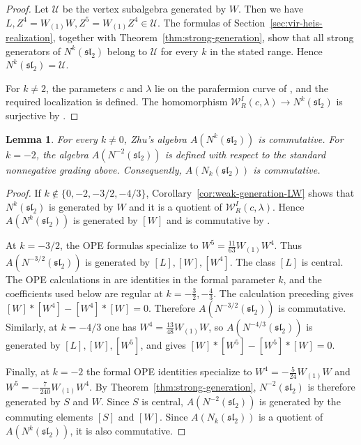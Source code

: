 \documentclass[11 pt]{amsart}
\newtheorem{lemma}{Lemma}
\theoremstyle{definition}
\theoremstyle{plain}
\begin{document}
\begin{proof}
Let $\mathcal U$ be the vertex subalgebra generated by $W$.  Then we have $L,Z^4=W_{(1)}W,Z^5=W_{(1)}Z^4\in\mathcal U$.
The formulas of Section~\ref{sec:vir-heis-realization}, together with
Theorem~\ref{thm:strong-generation}, show that all strong generators of
$N^k(\mathfrak{sl}_2)$ belong to $\mathcal U$ for every $k$ in the stated
range.  Hence $N^k(\mathfrak{sl}_2)=\mathcal U$.

For $k\neq2$, the parameters $c$ and $\lambda$ lie on the parafermion
curve of \cite[Theorem~7.1]{LinshawWinfty}, and the required
localization is defined.  The homomorphism
$\mathcal W^I_R(c,\lambda)\to N^k(\mathfrak{sl}_2)$ is surjective by
\cite[Remark~5.1]{LinshawWinfty}.
\end{proof}

\begin{lemma}\label{lem:zhu-commutative-uniform}
For every $k\neq0$, Zhu's algebra $A(N^k(\mathfrak{sl}_2))$ is
commutative. For $k=-2$, the algebra $A(N^{-2}(\mathfrak{sl}_2))$ is
defined with respect to the standard nonnegative grading above. Consequently,
$A(N_k(\mathfrak{sl}_2))$ is commutative.
\end{lemma}

\begin{proof}
If $k\notin\{0,-2,-3/2,-4/3\}$,
Corollary~\ref{cor:weak-generation-LW} shows that $N^k(\mathfrak{sl}_2)$ is
generated by $W$ and it is a quotient of  $\mathcal W^I_R(c,\lambda)$.   Hence $A(N^k(\mathfrak{sl}_2))$ is generated by
$[W]$ and is commutative by  \cite[Theorem 5.4]{LinshawWinfty}.

At $k=-3/2$, the OPE formulas specialize to
$W^5=\frac{11}{63}W_{(1)}W^4$.
Thus $A(N^{-3/2}(\mathfrak{sl}_2))$ is generated by
$[L],[W],[W^4]$. The class $[L]$ is central. The OPE calculations in
\cite{DLY} are identities in the formal
parameter $k$, and the coefficients used below are regular at
$k=-\frac32,-\frac43$.  The calculation preceding
\cite[Lemma~2.6]{DLY} gives
$[W]*[W^4]-[W^4]*[W]=0$.
Therefore $A(N^{-3/2}(\mathfrak{sl}_2))$ is commutative.  Similarly, at
$k=-4/3$ one has $W^4=\frac{13}{48}W_{(1)}W$,
so $A(N^{-4/3}(\mathfrak{sl}_2))$ is generated by
$[L],[W],[W^5]$, and
\cite[Lemma~2.6]{DLY} gives $[W]*[W^5]-[W^5]*[W]=0$.

Finally, at $k=-2$ the formal OPE identities specialize to
$W^4=-\frac{5}{24}W_{(1)}W$ and
$W^5=-\frac{7}{240}W_{(1)}W^4$.
By Theorem~\ref{thm:strong-generation}, $N^{-2}(\mathfrak{sl}_2)$ is therefore
generated by $S$ and $W$. Since $S$ is central,
$A(N^{-2}(\mathfrak{sl}_2))$ is generated by the commuting elements
$[S]$ and $[W]$. Since $A(N_k(\mathfrak{sl}_2))$ is a quotient of
$A(N^k(\mathfrak{sl}_2))$, it is also commutative.
\end{proof}
\end{document}
